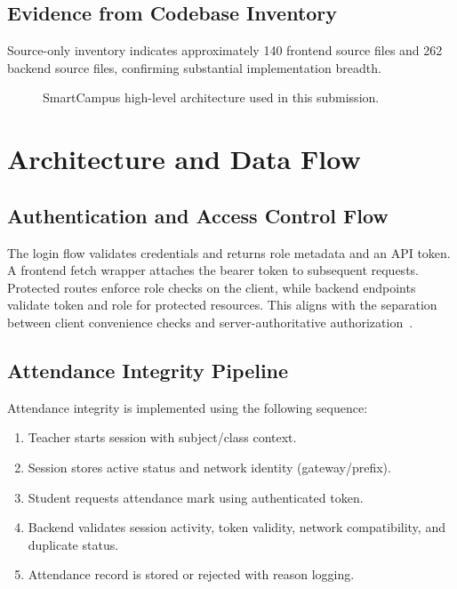 \documentclass[conference]{IEEEtran}
\begin{document}
\subsection{Evidence from Codebase Inventory}
Source-only inventory indicates approximately 140 frontend source files and 262 backend source files, confirming substantial implementation breadth.

\begin{figure}[htbp]
\centering
{}
\caption{SmartCampus high-level architecture used in this submission.}
\label{fig:architecture}
\end{figure}

\section{Architecture and Data Flow}
\subsection{Authentication and Access Control Flow}
The login flow validates credentials and returns role metadata and an API token. A frontend fetch wrapper attaches the bearer token to subsequent requests. Protected routes enforce role checks on the client, while backend endpoints validate token and role for protected resources. This aligns with the separation between client convenience checks and server-authoritative authorization~\cite{owasp_top10}.

\subsection{Attendance Integrity Pipeline}
Attendance integrity is implemented using the following sequence:
\begin{enumerate}
    \item Teacher starts session with subject/class context.
    \item Session stores active status and network identity (gateway/prefix).
    \item Student requests attendance mark using authenticated token.
    \item Backend validates session activity, token validity, network compatibility, and duplicate status.
    \item Attendance record is stored or rejected with reason logging.
\end{enumerate}
\end{document}

